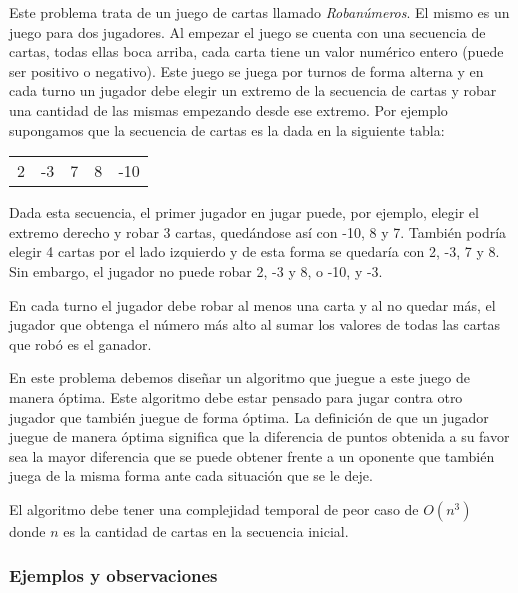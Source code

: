 Este problema trata de un juego de cartas llamado \emph{Robanúmeros}. El mismo es un juego para dos jugadores. Al empezar el juego se cuenta con una secuencia de cartas, todas ellas boca arriba, cada carta tiene un valor numérico entero (puede ser positivo o negativo). Este juego se juega por turnos de forma alterna y en cada turno un jugador debe elegir un extremo de la secuencia de cartas y robar una cantidad de las mismas empezando desde ese extremo. Por ejemplo supongamos que la secuencia de cartas es la dada en la siguiente tabla:

\begin{tabular}{|c|c|c|c|c|}
\hline
2 & -3 & 7 & 8 & -10
\hline
\end{tabular}

Dada esta secuencia, el primer jugador en jugar puede, por ejemplo, elegir el extremo derecho y robar 3 cartas, quedándose así con -10, 8 y 7. También podría elegir 4 cartas por el lado izquierdo y de esta forma se quedaría con 2, -3, 7 y 8. Sin embargo, el jugador no puede robar 2, -3 y 8, o -10, y -3.

En cada turno el jugador debe robar al menos una carta y al no quedar más, el jugador que obtenga el número más alto al sumar los valores de todas las cartas que robó es el ganador.

En este problema debemos diseñar un algoritmo que juegue a este juego de manera óptima. Este algoritmo debe estar pensado para jugar contra otro jugador que también juegue de forma óptima. La definición de que un jugador juegue de manera óptima significa que la diferencia de puntos obtenida a su favor sea la mayor diferencia que se puede obtener frente a un oponente que también juega de la misma forma ante cada situación que se le deje.

El algoritmo debe tener una complejidad temporal de peor caso de $O(n^3)$ donde $n$ es la cantidad de cartas en la secuencia inicial.

\subsubsection{Ejemplos y observaciones}

